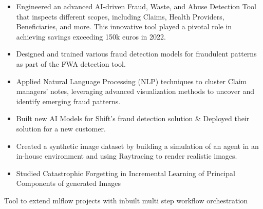 \documentclass[10pt,letter,ragged2e,withhyper]{altacv}
\renewcommand{\divider}{\textcolor{body!30}{\hdashrule{\linewidth}{0.6pt}{0.5ex}}\medskip}
\begin{document}
\begin{paracol}{2}
\begin{itemize}
  \item Engineered an advanced AI-driven Fraud, Waste, and Abuse Detection Tool that inspects different scopes, including Claims, Health Providers, Beneficiaries, and more. This innovative tool played a pivotal role in achieving savings exceeding 150k euros in 2022.
  \item Designed and trained various fraud detection models for fraudulent patterns as part of the FWA detection tool.
\end{itemize}

\divider
{}

\begin{itemize}
  \item Applied Natural Language Processing (NLP) techniques to cluster Claim managers' notes, leveraging advanced visualization methods to uncover and identify emerging fraud patterns.
  \item Built new AI Models for Shift's fraud detection solution \& Deployed their solution for a new customer.
\end{itemize}

\divider
{}

\begin{itemize}
  \item Created a synthetic image dataset by building a simulation of an agent in an in-house environment and using Raytracing to render realistic images.
  \item Studied Catastrophic Forgetting in Incremental Learning of Principal Components of generated Images
\end{itemize}





Tool to extend mlflow projects with inbuilt multi step workflow orchestration


\divider
{}


\end{paracol}
\end{document}
